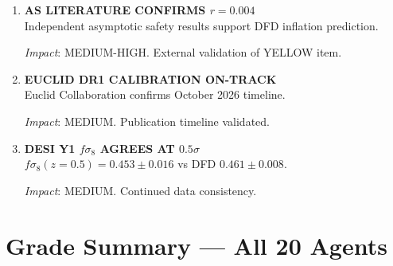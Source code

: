 \documentclass[11pt,a4paper]{article}
\begin{document}
\begin{enumerate}[label=\textbf{\arabic*.}, leftmargin=1.5cm]
\item \textbf{AS LITERATURE CONFIRMS $r = 0.004$}\\
Independent asymptotic safety results support DFD inflation prediction.

\textit{Impact}: MEDIUM-HIGH. External validation of YELLOW item.

\item \textbf{EUCLID DR1 CALIBRATION ON-TRACK}\\
Euclid Collaboration confirms October 2026 timeline.

\textit{Impact}: MEDIUM. Publication timeline validated.

\item \textbf{DESI Y1 $f\sigma_8$ AGREES AT $0.5\sigma$}\\
$f\sigma_8(z=0.5) = 0.453 \pm 0.016$ vs DFD $0.461 \pm 0.008$.

\textit{Impact}: MEDIUM. Continued data consistency.

\end{enumerate}


\section{Grade Summary --- All 20 Agents}
\label{sec:grades}
\end{document}
